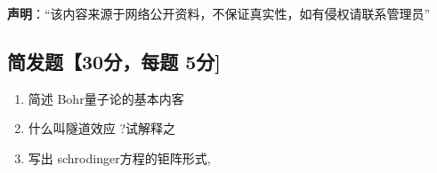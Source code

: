 
\textbf{声明}：“该内容来源于网络公开资料，不保证真实性，如有侵权请联系管理员”

\subsection{简发题【30分，每题 5分]}
\begin{enumerate}
\item 简述 Bohr量子论的基本内客
\item 什么叫隧道效应 ?试解释之
\item 写出 schrodinger方程的钜阵形式,
\end{enumerate}
